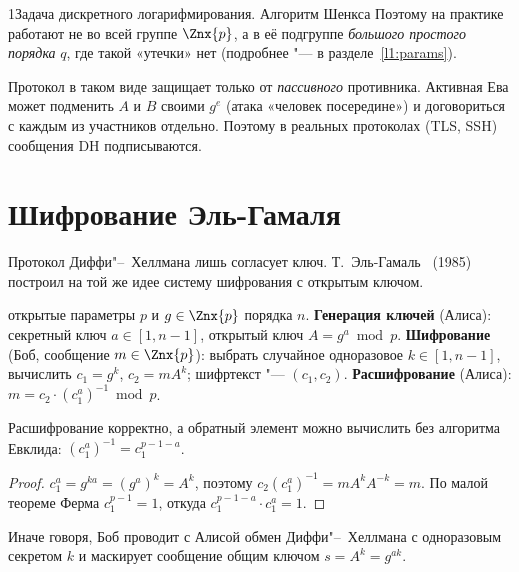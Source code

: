 \begin{lecture}{1}{Задача дискретного логарифмирования. Алгоритм Шенкса}
Поэтому на практике работают не во всей группе $\Znx{p}$, а в её подгруппе \emph{большого
простого порядка} $q$, где такой «утечки» нет (подробнее "--- в разделе~\ref{l1:params}).

\begin{remark}
Протокол в таком виде защищает только от \emph{пассивного} противника. Активная Ева может
подменить $A$ и $B$ своими $g^{e}$ (атака «человек посередине») и договориться с каждым из
участников отдельно. Поэтому в реальных протоколах (TLS, SSH) сообщения DH подписываются.
\end{remark}


\section{Шифрование Эль-Гамаля}

Протокол Диффи"--~Хеллмана лишь согласует ключ. Т.~Эль-Гамаль~\cite{elgamal} (1985) построил на
той же идее систему шифрования с открытым ключом.

\begin{algorithm}\label{l1:elgamal}
\begin{algorithmic}[1]
\Require открытые параметры $p$ и $g \in \Znx{p}$ порядка $n$.
\State \textbf{Генерация ключей} (Алиса): секретный ключ $a \in [1, n - 1]$, открытый ключ
$A = g^a \bmod p$.
\State \textbf{Шифрование} (Боб, сообщение $m \in \Znx{p}$): выбрать случайное одноразовое
$k \in [1, n - 1]$, вычислить $c_1 = g^k$, $c_2 = m A^k$; шифртекст "--- $(c_1, c_2)$.
\State \textbf{Расшифрование} (Алиса): $m = c_2 \cdot (c_1^{a})^{-1} \bmod p$.
\end{algorithmic}
\end{algorithm}

\begin{proposition}
Расшифрование корректно, а обратный элемент можно вычислить без алгоритма Евклида:
$(c_1^a)^{-1} = c_1^{p - 1 - a}$.
\end{proposition}

\begin{proof}
$c_1^a = g^{ka} = (g^a)^k = A^k$, поэтому $c_2 (c_1^a)^{-1} = m A^k A^{-k} = m$. По малой
теореме Ферма $c_1^{p-1} = 1$, откуда $c_1^{p-1-a} \cdot c_1^a = 1$.
\end{proof}

Иначе говоря, Боб проводит с Алисой обмен Диффи"--~Хеллмана с одноразовым секретом $k$ и маскирует
сообщение общим ключом $s = A^k = g^{ak}$.


\end{lecture}
